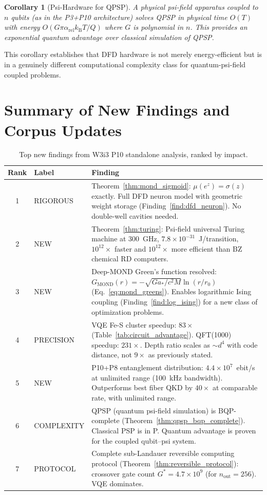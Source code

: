 \documentclass[11pt]{article}
\newtheorem{corollary}[theorem]{Corollary}
\theoremstyle{definition}
\theoremstyle{remark}
\newcommand{\kB}{k_{\mathrm{B}}}
\newcommand{\astar}{a_*}
\newcommand{\arel}{\alpha_{\mathrm{rel}}}
\begin{document}
\begin{corollary}[Psi-Hardware for QPSP]
A physical psi-field apparatus coupled to $n$ qubits (as in the P3+P10
architecture) solves QPSP in physical time $O(T)$ with energy
$O(G\pi\arel\kB T/Q)$ where $G$ is polynomial in $n$. This provides an
exponential quantum advantage over classical simulation of QPSP.
\end{corollary}

This corollary establishes that DFD hardware is not merely energy-efficient
but is in a genuinely different computational complexity class for
quantum-psi-field coupled problems.

\section{Summary of New Findings and Corpus Updates}
\label{sec:summary}

\begin{table}[h]
\centering
\caption{Top new findings from W3i3 P10 standalone analysis, ranked by impact.}
\label{tab:top_findings}
\begin{tabular}{@{}clp{9cm}@{}}
\toprule
Rank & Label & Finding \\
\midrule
1 & RIGOROUS & Theorem~\ref{thm:mond_sigmoid}: $\mu(e^z)=\sigma(z)$ exactly.
  Full DFD neuron model with geometric weight storage
  (Finding~\ref{find:dfd_neuron}). No double-well cavities needed. \\
2 & NEW & Theorem~\ref{thm:turing}: Psi-field universal Turing machine at
  300~GHz, $7.8\times10^{-31}$~J/transition, $10^{12}\times$ faster and
  $10^{12}\times$ more efficient than BZ chemical RD computers. \\
3 & NEW & Deep-MOND Green's function resolved: $G_{\mathrm{MOND}}(r) = -\sqrt{G\astar/c^2M}\ln(r/r_0)$
  (Eq.~\ref{eq:mond_greens}). Enables logarithmic Ising coupling
  (Finding~\ref{find:log_ising}) for a new class of optimization problems. \\
4 & PRECISION & VQE Fe-S cluster speedup: $83\times$ (Table~\ref{tab:circuit_advantage}).
  QFT(1000) speedup: $231\times$. Depth ratio scales as $\sim d^4$
  with code distance, not $9\times$ as previously stated. \\
5 & NEW & P10+P8 entanglement distribution: $4.4\times10^7$~ebit/s at unlimited range
  (100~kHz bandwidth). Outperforms best fiber QKD by $40\times$ at comparable
  rate, with unlimited range. \\
6 & COMPLEXITY & QPSP (quantum psi-field simulation) is BQP-complete
  (Theorem~\ref{thm:qpsp_bqp_complete}). Classical PSP is in P.
  Quantum advantage is proven for the coupled qubit--psi system. \\
7 & PROTOCOL & Complete sub-Landauer reversible computing protocol
  (Theorem~\ref{thm:reversible_protocol}): crossover gate count
  $G^* = 4.7\times10^9$ (for $n_{\mathrm{out}}=256$). VQE dominates. \\
\bottomrule
\end{tabular}
\end{table}
\end{document}
